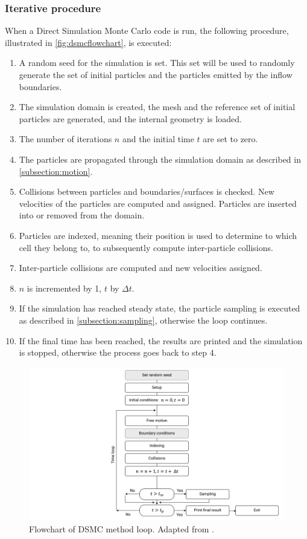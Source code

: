 \subsubsection{Iterative procedure}
When a Direct Simulation Monte Carlo code is run, the following procedure, illustrated in \autoref{fig:dsmcflowchart}, is executed:
\begin{enumerate}
    \item A random seed for the simulation is set. This set will be used to randomly generate the set of initial particles and the particles emitted by the inflow boundaries.
    \item The simulation domain is created, the mesh and the reference set of initial particles are generated, and the internal geometry is loaded.
    \item The number of iterations $n$ and the initial time $t$ are set to zero.
    \item The particles are propagated through the simulation domain as described in \autoref{subsection:motion}.
    \item Collisions between particles and boundaries/surfaces is checked. New velocities of the particles are computed and assigned. Particles are inserted into or removed from the domain.
    \item Particles are indexed, meaning their position is used to determine to which cell they belong to, to subsequently compute inter-particle collisions.
    \item Inter-particle collisions are computed and new velocities assigned.
    \item $n$ is incremented by 1, $t$ by $\Delta t$.
    \item If the simulation has reached steady state, the particle sampling is executed as described in \autoref{subsection:sampling}, otherwise the loop continues.
    \item If the final time has been reached, the results are printed and the simulation is stopped, otherwise the process goes back to step 4.
\end{enumerate}

\begin{figure}
    \centering
    \includegraphics[width=\textwidth]{../Images/3. Methodology/dsmcflowchart.pdf}
    \caption{Flowchart of DSMC method loop. Adapted from \cite{dsmcnotes}.}
    \label{fig:dsmcflowchart}
\end{figure}

